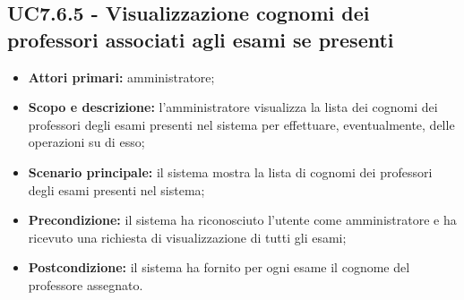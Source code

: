 \documentclass[AnalisiDeiRequisiti.tex]{subfiles}
\begin{document}
\subsection{UC7.6.5 - Visualizzazione cognomi dei professori associati agli esami se presenti}
\begin{itemize}
	\item \textbf{Attori primari:} amministratore;
	\item \textbf{Scopo e descrizione:} l'amministratore visualizza la lista dei cognomi dei professori degli esami presenti nel sistema per effettuare, eventualmente, delle operazioni su di esso;
	\item \textbf{Scenario principale:} il sistema mostra la lista di cognomi dei professori degli esami presenti nel sistema;
	\item \textbf{Precondizione:} il sistema ha riconosciuto l'utente come amministratore e ha ricevuto una richiesta di visualizzazione di tutti gli esami; 
	\item \textbf{Postcondizione:} il sistema ha fornito per ogni esame il cognome del professore assegnato.
\end{itemize}
\end{document}
